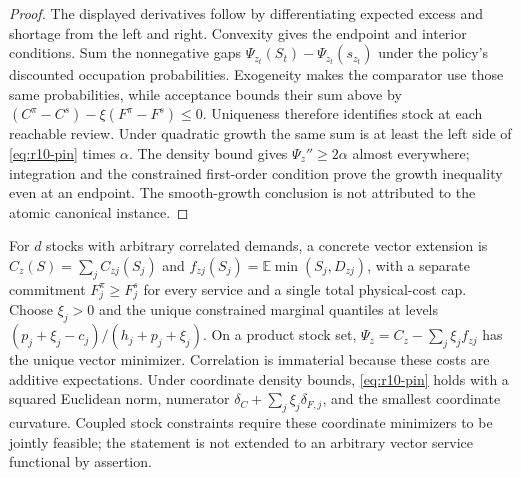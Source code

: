 \documentclass[11pt,letterpaper]{article}
\theoremstyle{definition}
\newcommand{\E}{\mathbb E}
\newcommand{\1}{\mathbf 1}
\begin{document}
\begin{proof}
The displayed derivatives follow by differentiating expected excess and shortage from the left and right. Convexity gives the endpoint and interior conditions. Sum the nonnegative gaps $\Psi_{z_t}(S_t)-\Psi_{z_t}(s_{z_t})$ under the policy's discounted occupation probabilities. Exogeneity makes the comparator use those same probabilities, while acceptance bounds their sum above by $(C^\pi-C^s)-\xi(F^\pi-F^s)\leq0$. Uniqueness therefore identifies stock at each reachable review. Under quadratic growth the same sum is at least the left side of \eqref{eq:r10-pin} times $\alpha$. The density bound gives $\Psi_z''\geq2\alpha$ almost everywhere; integration and the constrained first-order condition prove the growth inequality even at an endpoint. The smooth-growth conclusion is not attributed to the atomic canonical instance.
\end{proof}

For $d$ stocks with arbitrary correlated demands, a concrete vector extension is $C_z(S)=\sum_j C_{zj}(S_j)$ and $f_{zj}(S_j)=\E\min(S_j,D_{zj})$, with a separate commitment $F_j^\pi\geq F_j^s$ for every service and a single total physical-cost cap. Choose $\xi_j>0$ and the unique constrained marginal quantiles at levels $(p_j+\xi_j-c_j)/(h_j+p_j+\xi_j)$. On a product stock set, $\Psi_z=C_z-\sum_j\xi_j f_{zj}$ has the unique vector minimizer. Correlation is immaterial because these costs are additive expectations. Under coordinate density bounds, \eqref{eq:r10-pin} holds with a squared Euclidean norm, numerator $\delta_C+\sum_j\xi_j\delta_{F,j}$, and the smallest coordinate curvature. Coupled stock constraints require these coordinate minimizers to be jointly feasible; the statement is not extended to an arbitrary vector service functional by assertion.
\end{document}
